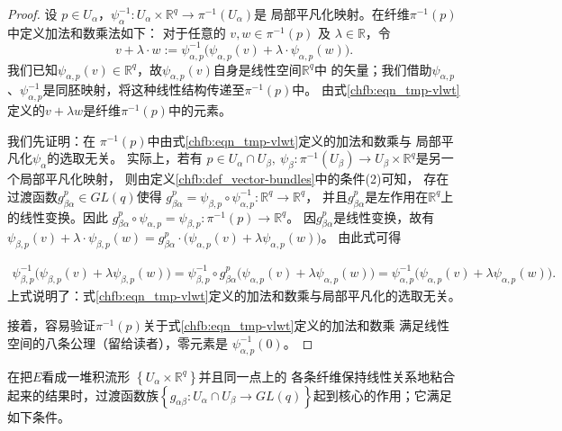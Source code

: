 \begin{proof}
设 $p \in U_\alpha$，$\psi_\alpha^{-1}: U_\alpha \times \mathbb{R}^q \rightarrow \pi^{-1} (U_\alpha)$是
局部平凡化映射。在纤维$\pi^{-1}(p)$中定义加法和数乘法如下：
对于任意的 $v, w \in \pi^{-1}(p)$ 及 $\lambda \in \mathbb{R}$，令
\begin{equation}\label{chfb:eqn_tmp-vlwt}
    v+\lambda \cdot w := \psi_{\alpha, p}^{-1} \bigl(\psi_{\alpha, p} (v)
    +\lambda \cdot \psi_{\alpha, p} (w)\bigr) .
\end{equation}
我们已知$\psi_{\alpha, p} (v)\in \mathbb{R}^q$，故$\psi_{\alpha, p} (v)$自身是线性空间$\mathbb{R}^q$中
的矢量；我们借助$\psi_{\alpha, p}$、$\psi_{\alpha, p}^{-1}$是同胚映射，将这种线性结构传递至$\pi^{-1}(p)$中。
由式\eqref{chfb:eqn_tmp-vlwt}定义的$v+ \lambda w $是纤维$ \pi^{-1}(p)$中的元素。

我们先证明：在 $\pi^{-1}(p)$中由式\eqref{chfb:eqn_tmp-vlwt}定义的加法和数乘与
局部平凡化$\psi_\alpha$的选取无关。
实际上，若有 $p \in U_\alpha \cap U_\beta,\ \psi_\beta: \pi^{-1} (U_\beta )
 \rightarrow U_\beta \times \mathbb{R}^q $是另一个局部平凡化映射，
则由定义\ref{chfb:def_vector-bundles}中的条件(2)可知，
存在过渡函数$g_{\beta \alpha}^p \in GL(q)$使得
$g_{\beta \alpha}^p =\psi_{\beta, p} \circ \psi_{\alpha, p}^{-1}: \mathbb{R}^q \rightarrow \mathbb{R}^q $，
并且$g_{\beta \alpha}^p$是左作用在$\mathbb{R}^q$上的线性变换。因此
$g_{\beta \alpha}^p \circ \psi_{\alpha, p}=\psi_{\beta, p}: \pi^{-1}(p) \rightarrow \mathbb{R}^q $。
因$g_{\beta \alpha}^p$是线性变换，故有
$    \psi_{\beta, p}(v )+\lambda \cdot \psi_{\beta, p} (w)=
    g_{\beta \alpha}^p \cdot \bigl(\psi_{\alpha, p}(v)+ \lambda \psi_{\alpha, p} (w)\bigr) $。
由此式可得

\begin{align*}
    \psi_{\beta, p}^{-1} \bigl(\psi_{\beta, p} (v)+\lambda \psi_{\beta, p} (w)\bigr)
    = \psi_{\beta, p}^{-1} \circ g_{\beta \alpha}^p \bigl(\psi_{\alpha, p}(v)+\lambda \psi_{\alpha, p}(w)\bigr)
    = \psi_{\alpha, p}^{-1} \bigl(\psi_{\alpha, p} (v)+\lambda \psi_{\alpha, p} (w)\bigr) .
\end{align*}
上式说明了：式\eqref{chfb:eqn_tmp-vlwt}定义的加法和数乘与局部平凡化的选取无关。

接着，容易验证$\pi^{-1}(p)$关于式\eqref{chfb:eqn_tmp-vlwt}定义的加法和数乘
满足线性空间的八条公理（留给读者），零元素是 $\psi_{\alpha, p}^{-1}(0)$。
\end{proof}

在把$E$看成一堆积流形 $\left\{U_\alpha \times \mathbb{R}^q\right\}$并且同一点上的
各条纤维保持线性关系地粘合起来的结果时，过渡函数族$\left\{g_{\alpha \beta}: U_\alpha \cap U_\beta
\rightarrow GL(q)\right\}$起到核心的作用；它满足如下条件。

